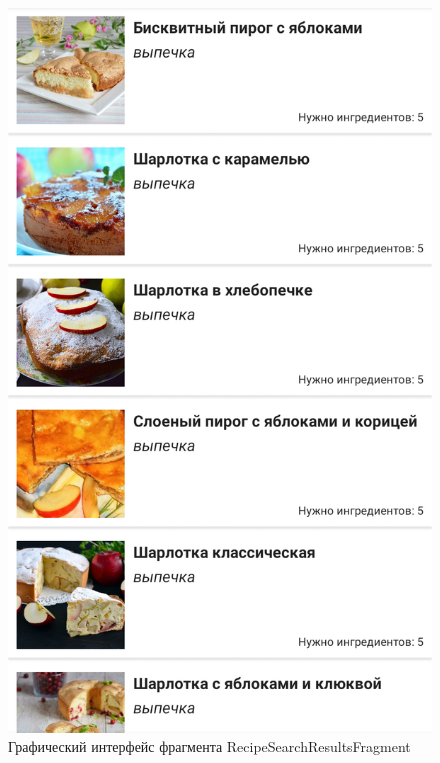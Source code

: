 \documentclass[14pt]{matmex-diploma-custom}
\begin{document}
\begin{figure}[h]
\centering
\includegraphics[scale=0.15]{resultpage.png}
\caption{Графический интерфейс фрагмента RecipeSearchResultsFragment}
\label{resultpage}
\end{figure}
\end{document}

